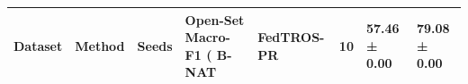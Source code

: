 \begin{tabular}{llrll}
\toprule
Dataset & Method & Seeds & Open-Set Macro-F1 (%
\midrule
B-NAT & FedTROS-PR & 10 & 57.46 ± 0.00 & 79.08 ± 0.00 \\
\bottomrule
\end{tabular}
